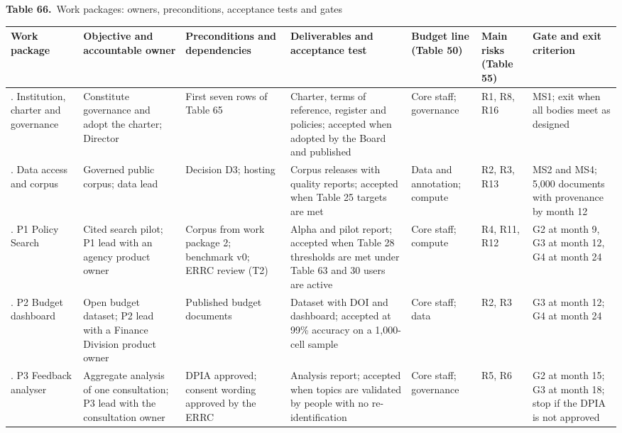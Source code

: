 \documentclass[border=10pt]{standalone}
\begin{document}
\begin{minipage}{22cm}
{\large\bfseries Table 66.}\ {\large Work packages: owners, preconditions, acceptance tests and gates}\par\vspace{7pt}
\small
{}
\begin{tabularx}{\linewidth}{@{}>{\hsize=0.868\hsize\raggedright\arraybackslash}X>{\hsize=1.157\hsize\raggedright\arraybackslash}X>{\hsize=1.157\hsize\raggedright\arraybackslash}X>{\hsize=1.331\hsize\raggedright\arraybackslash}X>{\hsize=0.810\hsize\raggedright\arraybackslash}X>{\hsize=0.636\hsize\raggedright\arraybackslash}X>{\hsize=1.041\hsize\raggedright\arraybackslash}X@{}}
\arrayrulecolor{bapilrule}\toprule
\rowcolor{white}\textbf{Work package} & \textbf{Objective and accountable owner} & \textbf{Preconditions and dependencies} & \textbf{Deliverables and acceptance test} & \textbf{Budget line (Table 50)} & \textbf{Main risks (Table 55)} & \textbf{Gate and exit criterion} \\
\midrule
1. Institution, charter and governance & Constitute governance and adopt the charter; Director & First seven rows of Table 65 & Charter, terms of reference, register and policies; accepted when adopted by the Board and published & Core staff; governance & R1, R8, R16 & MS1; exit when all bodies meet as designed \\
2. Data access and corpus & Governed public corpus; data lead & Decision D3; hosting & Corpus releases with quality reports; accepted when Table 25 targets are met & Data and annotation; compute & R2, R3, R13 & MS2 and MS4; 5,000 documents with provenance by month 12 \\
3. P1 Policy Search & Cited search pilot; P1 lead with an agency product owner & Corpus from work package 2; benchmark v0; ERRC review (T2) & Alpha and pilot report; accepted when Table 28 thresholds are met under Table 63 and 30 users are active & Core staff; compute & R4, R11, R12 & G2 at month 9, G3 at month 12, G4 at month 24 \\
4. P2 Budget dashboard & Open budget dataset; P2 lead with a Finance Division product owner & Published budget documents & Dataset with DOI and dashboard; accepted at 99\% accuracy on a 1,000-cell sample & Core staff; data & R2, R3 & G3 at month 12; G4 at month 24 \\
5. P3 Feedback analyser & Aggregate analysis of one consultation; P3 lead with the consultation owner & DPIA approved; consent wording approved by the ERRC & Analysis report; accepted when topics are validated by people with no re-identification & Core staff; governance & R5, R6 & G2 at month 15; G3 at month 18; stop if the DPIA is not approved \\

\end{tabularx}
\end{minipage}
\end{document}
